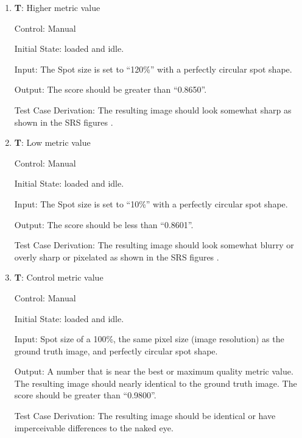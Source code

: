 \documentclass[12pt, titlepage]{article}
\newcounter{testnum} %
\begin{document}
\begin{enumerate}

  \item{\textbf{T\thetestnum \label{T_manualMetricHigh}}: Higher metric value\\}

    Control: Manual
              
    Initial State: \progname{} loaded and idle.
              
    Input: The Spot size is set to ``120\%'' with a perfectly circular spot shape.
              
    Output: The score should be greater than ``0.8650''.

    Test Case Derivation: The resulting image should look somewhat sharp as shown in the SRS figures \citep{SRS}.
					
  \item{\textbf{T\thetestnum \label{T_manualMetricLow}}: Low metric value\\}

  Control: Manual
              
  Initial State: \progname{} loaded and idle.
            
  Input: The Spot size is set to ``10\%'' with a perfectly circular spot shape.
            
  Output: The score should be less than ``0.8601''.

  Test Case Derivation: The resulting image should look somewhat blurry or overly sharp or pixelated as shown in the SRS figures \citep{SRS}.
  					
  \item{\textbf{T\thetestnum \label{T_manualMetricControl}}: Control metric value\\}

  Control: Manual
              
  Initial State: \progname{} loaded and idle.
            
  Input: Spot size of a 100\%, the same pixel size (image resolution) as the ground truth image, 
  and perfectly circular spot shape.
            
  Output: A number that is near the best or maximum quality metric value. The resulting image should nearly
  identical to the ground truth image. The score should be greater than ``0.9800''.

  Test Case Derivation: The resulting image should be identical or have imperceivable differences to the naked eye.

\end{enumerate}
\end{document}
